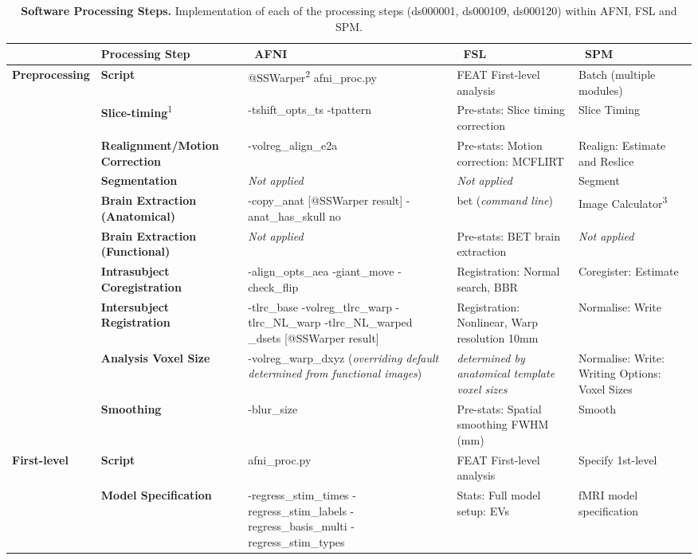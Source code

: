 \begin{table}[htbp]
\caption{\textbf{Software Processing Steps.} Implementation of  each of the processing steps (ds000001, ds000109, ds000120) within AFNI, FSL and SPM.}
\centering
\footnotesize
\hspace*{-1.5cm}
\begin{tabular}{@{}p{}*{4}{L{\tabcolsep\relax}}@{}}
\toprule
& \textbf{Processing Step} & \ \textbf{AFNI} & \ \textbf{FSL} & \ \textbf{SPM} \\
\midrule
\textbf{Preprocessing} & \textbf{Script} & @SSWarper\textsuperscript{2} afni\_proc.py & FEAT First-level analysis & Batch (multiple modules) \\
\cmidrule(lr){2-5} 
& \textbf{Slice-timing}\textsuperscript{1} & -tshift\_opts\_ts -tpattern  & Pre-stats: Slice timing correction & Slice Timing \\
\cmidrule(lr){2-5} 
& \textbf{Realignment/Motion Correction} & -volreg\_align\_e2a & Pre-stats: Motion correction: MCFLIRT & Realign: Estimate and Reslice \\
\cmidrule(lr){2-5}
& \textbf{Segmentation} & \textit{Not applied} & \textit{Not applied} & Segment \\ 
\cmidrule(lr){2-5}
& \textbf{Brain Extraction (Anatomical)} & -copy\_anat [@SSWarper result] -anat\_has\_skull no & bet (\textit{command line}) & Image Calculator\textsuperscript{3} \\ 
\cmidrule(lr){2-5}
& \textbf{Brain Extraction (Functional)} & \textit{Not applied} & Pre-stats: BET brain extraction & \textit{Not applied} \\ 
\cmidrule(lr){2-5}
& \textbf{Intrasubject Coregistration} & -align\_opts\_aea -giant\_move -check\_flip & Registration: Normal search, BBR & Coregister: Estimate \\ 
\cmidrule(lr){2-5}
& \textbf{Intersubject Registration} & -tlrc\_base -volreg\_tlrc\_warp -tlrc\_NL\_warp -tlrc\_NL\_warped \_dsets [@SSWarper result] & Registration: Nonlinear, Warp resolution 10mm & Normalise: Write \\
\cmidrule(lr){2-5}
& \textbf{Analysis Voxel Size} & -volreg\_warp\_dxyz (\textit{overriding default determined from functional images}) & \textit{determined by anatomical template voxel sizes} & Normalise: Write: Writing Options: Voxel Sizes \\
\cmidrule(lr){2-5}
& \textbf{Smoothing} & -blur\_size & Pre-stats: Spatial smoothing FWHM (mm) & Smooth \\
\midrule
\textbf{First-level} & \textbf{Script} & afni\_proc.py & FEAT First-level analysis & Specify 1st-level \\
 \cmidrule(lr){2-5}
 & \textbf{Model Specification} & -regress\_stim\_times -regress\_stim\_labels -regress\_basis\_multi -regress\_stim\_types & Stats: Full model setup: EVs & fMRI model specification \\
  \cmidrule(lr){2-5}
\end{tabular}
\label{tab:software_processing}
\end{table}

